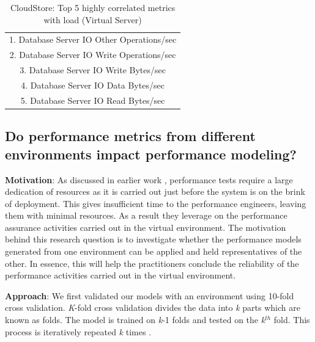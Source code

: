 \begin{table}[tbh]
	\centering
		\caption{CloudStore: Top 5 highly correlated metrics with load (Virtual Server)}
		\label{resultRQ3}
		\begin{tabular}{c}
			\toprule
			1. Database Server IO Other Operations/sec  \\
			2. Database Server IO Write Operations/sec   \\
			3. Database Server IO Write Bytes/sec \\
			4. Database Server IO Data Bytes/sec    \\
			5. Database Server IO Read Bytes/sec \\
			\bottomrule             
		\end{tabular}
\end{table}


\subsection{\textbf{Do performance metrics from different environments impact performance modeling?}}

\textbf{Motivation}: As discussed in earlier work \cite{Shang:2015:ADP:2668930.2688052} \cite{Nguyen:2012:ADP:2188286.2188344}, performance tests require a large dedication of resources as it is carried out just before the system is on the brink of deployment. This gives insufficient time to the performance engineers, leaving them with minimal resources. As a result they leverage on the performance assurance activities carried out in the virtual environment. The motivation behind this research question is to investigate whether the performance models generated from one environment can be applied and held representatives of the other. In essence, this will help the practitioners conclude the reliability of the performance activities carried out in the virtual environment. 

\textbf{Approach}: We first validated our models with an environment using 10-fold cross validation. \textit{K}-fold cross validation divides the data into \textit{k} parts which are known as folds. The model is trained on \textit{k}-1 folds and tested on the \textit{k}$^{th}$ fold. This process is iteratively repeated \textit{k} times \cite{10foldcross} \cite{kohavi1995study}.



